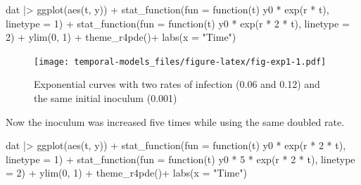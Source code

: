 \documentclass[
  letterpaper,
]{book}
\newenvironment{Shaded}{\begin{snugshade}}{\end{snugshade}}
\newcommand{\AttributeTok}[1]{\textcolor[rgb]{0.40,0.45,0.13}{#1}}
\newcommand{\ControlFlowTok}[1]{\textcolor[rgb]{0.00,0.23,0.31}{#1}}
\newcommand{\DecValTok}[1]{\textcolor[rgb]{0.68,0.00,0.00}{#1}}
\newcommand{\FunctionTok}[1]{\textcolor[rgb]{0.28,0.35,0.67}{#1}}
\newcommand{\NormalTok}[1]{\textcolor[rgb]{0.00,0.23,0.31}{#1}}
\newcommand{\SpecialCharTok}[1]{\textcolor[rgb]{0.37,0.37,0.37}{#1}}
\newcommand{\StringTok}[1]{\textcolor[rgb]{0.13,0.47,0.30}{#1}}
\begin{document}
\begin{Shaded}
\begin{Highlighting}[]
\NormalTok{dat }\SpecialCharTok{|\textgreater{}}
  \FunctionTok{ggplot}\NormalTok{(}\FunctionTok{aes}\NormalTok{(t, y)) }\SpecialCharTok{+}
  \FunctionTok{stat\_function}\NormalTok{(}\AttributeTok{fun =} \ControlFlowTok{function}\NormalTok{(t) y0 }\SpecialCharTok{*} \FunctionTok{exp}\NormalTok{(r }\SpecialCharTok{*}\NormalTok{ t), }\AttributeTok{linetype =} \DecValTok{1}\NormalTok{) }\SpecialCharTok{+}
  \FunctionTok{stat\_function}\NormalTok{(}\AttributeTok{fun =} \ControlFlowTok{function}\NormalTok{(t) y0 }\SpecialCharTok{*} \FunctionTok{exp}\NormalTok{(r }\SpecialCharTok{*} \DecValTok{2} \SpecialCharTok{*}\NormalTok{ t), }\AttributeTok{linetype =} \DecValTok{2}\NormalTok{) }\SpecialCharTok{+}
  \FunctionTok{ylim}\NormalTok{(}\DecValTok{0}\NormalTok{, }\DecValTok{1}\NormalTok{) }\SpecialCharTok{+}
  \FunctionTok{theme\_r4pde}\NormalTok{()}\SpecialCharTok{+}
  \FunctionTok{labs}\NormalTok{(}\AttributeTok{x =} \StringTok{"Time"}\NormalTok{)}
\end{Highlighting}
\end{Shaded}

\begin{figure}

{\centering \texttt{[image: temporal-models\_files/figure-latex/fig-exp1-1.pdf]}

}

\caption{\label{fig-exp1}Exponential curves with two rates of infection
(0.06 and 0.12) and the same initial inoculum (0.001)}

\end{figure}

Now the inoculum was increased five times while using the same doubled
rate.

\begin{Shaded}
\begin{Highlighting}[]
\NormalTok{dat }\SpecialCharTok{|\textgreater{}}
  \FunctionTok{ggplot}\NormalTok{(}\FunctionTok{aes}\NormalTok{(t, y)) }\SpecialCharTok{+}
  \FunctionTok{stat\_function}\NormalTok{(}\AttributeTok{fun =} \ControlFlowTok{function}\NormalTok{(t) y0 }\SpecialCharTok{*} \FunctionTok{exp}\NormalTok{(r }\SpecialCharTok{*} \DecValTok{2} \SpecialCharTok{*}\NormalTok{ t), }\AttributeTok{linetype =} \DecValTok{1}\NormalTok{) }\SpecialCharTok{+}
  \FunctionTok{stat\_function}\NormalTok{(}\AttributeTok{fun =} \ControlFlowTok{function}\NormalTok{(t) y0 }\SpecialCharTok{*} \DecValTok{5} \SpecialCharTok{*} \FunctionTok{exp}\NormalTok{(r }\SpecialCharTok{*} \DecValTok{2} \SpecialCharTok{*}\NormalTok{ t), }\AttributeTok{linetype =} \DecValTok{2}\NormalTok{) }\SpecialCharTok{+}
  \FunctionTok{ylim}\NormalTok{(}\DecValTok{0}\NormalTok{, }\DecValTok{1}\NormalTok{) }\SpecialCharTok{+}
  \FunctionTok{theme\_r4pde}\NormalTok{()}\SpecialCharTok{+}
  \FunctionTok{labs}\NormalTok{(}\AttributeTok{x =} \StringTok{"Time"}\NormalTok{)}
\end{Highlighting}
\end{Shaded}
\end{document}
